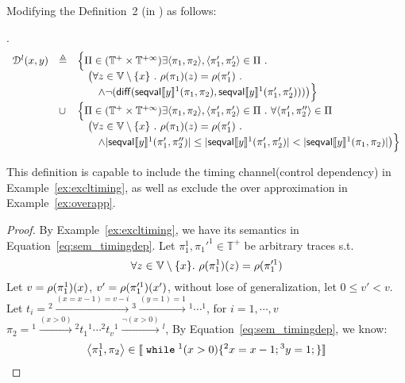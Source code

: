 %
\clearpage
\clearpage
\begin{example}
Modifying the Definition~2 (in \cite{cousot2019abstract}) as follows:
\begin{defn}.
\label{defn:mdfy_dep}
\[
	\begin{array}{lll}
	\mathcal{D}^l(x, y) & \triangleq &
	\Big\{ 
	\Pi \in (\mathbb{T}^{+} \times \mathbb{T}^{+\infty})
	\exists \langle \pi_1, \pi_2 \rangle, \langle \pi_1', \pi_2' \rangle \in \Pi ~.~ \\
	&& \quad \big(
	\forall z \in \mathbb{V}\setminus \{x\} ~.~ \rho(\pi_1)(z) = \rho(\pi_1') ~.~ \\
	&& \quad  \quad \land \neg(\mathsf{diff}(\mathsf{seqval}\llbracket y \rrbracket{}^1(\pi_1, \pi_2 ), \mathsf{seqval}\llbracket y \rrbracket{}^1(\pi'_1, \pi_2')))
	\big) \Big\} \\
	& \cup & \Big\{ \Pi \in (\mathbb{T}^{+} \times \mathbb{T}^{+\infty})
	\exists \langle \pi_1, \pi_2 \rangle, \langle \pi_1', \pi_2' \rangle \in \Pi ~.~ \forall \langle \pi_1', \pi_2'' \rangle \in \Pi\\
	&& \quad \big(
	\forall z \in \mathbb{V}\setminus \{x\} ~.~ \rho(\pi_1)(z) = \rho(\pi_1') ~.~ \\
	&& \quad  \quad  \land |\mathsf{seqval}\llbracket y \rrbracket{}^1(\pi_1', \pi_2'')| \leq |\mathsf{seqval}\llbracket y \rrbracket{}^1(\pi_1', \pi_2')| <  
	|\mathsf{seqval}\llbracket y \rrbracket{}^1(\pi_1, \pi_2)|\big) \Big\}
	\end{array}
\]
\end{defn}
This definition is capable to include the timing channel(control dependency) in Example~\ref{ex:excltiming},
as well as exclude the over approximation in Example~\ref{ex:overapp}.
%
\begin{proof}
By Example~\ref{ex:excltiming}, we have its semantics in Equation~\ref{eq:sem_timingdep}.
%
%
Let $\pi_1^1, \pi_1'^1 \in \mathbb{T^{+}}$ be arbitrary traces s.t. 
%
$$\forall z \in \mathbb{V}\setminus \{x\}. ~ \rho(\pi_1^1)(z) = \rho(\pi_1'^1) $$ 
%
Let $v = \rho(\pi_1^1)(x) $, $v' = \rho(\pi_1'^1)(x')$, without lose of generalization, let $0 \leq v' < v$.
\\
Let 
$t_i = {}^2 \xrightarrow{(x = x - 1) = v - i } {}^3 \xrightarrow{(y = 1) = 1} {}^1 \cdots  {}^1$, for $i = 1, \cdots, v$
%
$\pi_2 = {}^1 \xrightarrow{(x > 0)} {}^2 t_1 {}^1 \cdots   {}^2 t_v {}^1 \xrightarrow{\neg(x > 0)} {}^l $,
%
 By Equation~\ref{eq:sem_timingdep}, we know:
\[
	\left< \pi_1^1, \pi_2 \right> \in \sem{\ewhile {}^1 (x > 0) \{{}^2 x = x - 1; {}^3 y = 1;\} }
\]
\end{proof}
\end{example}
